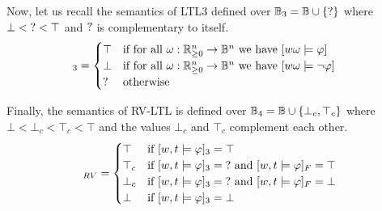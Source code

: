 Now, let us recall the semantics of LTL3 defined over $\mathbb{B}_3 = \mathbb{B} \cup \{\text{?}\}$ where $\bot < \text{?} < \top$ and $\text{?}$ is complementary to itself. %
\begin{align*}
	[w,t \models \varphi]_3 &= \begin{cases}
		\top &\text{if for all } \omega : \R_{\geq 0}^n \to \B^n \text{ we have } [w \omega \models \varphi]\\
		\bot &\text{if for all } \omega : \R_{\geq 0}^n \to \B^n \text{ we have } [w \omega \models \lnot \varphi]\\
		\? &\text{otherwise}\\
	\end{cases}
\end{align*}

Finally, the semantics of RV-LTL is defined over $\mathbb{B}_4 = \mathbb{B} \cup \{\bot_c, \top_c \}$ where $\bot < \bot_c < \top_c < \top$ and the values $\bot_c$ and $\top_c$ complement each other.
\begin{align*}
	[w,t \models \varphi]_{RV} &= \begin{cases}
		\top &\text{if } [w,t \models \varphi]_3 = \top \\
		\top_c &\text{if } [w,t \models \varphi]_3 = \? \text{ and } [w,t \models \varphi]_F = \top \\
		\bot_c &\text{if } [w,t \models \varphi]_3 = \? \text{ and } [w,t \models \varphi]_F = \bot \\
		\bot &\text{if } [w,t \models \varphi]_3 = \bot \\
	\end{cases} \\
\end{align*}	